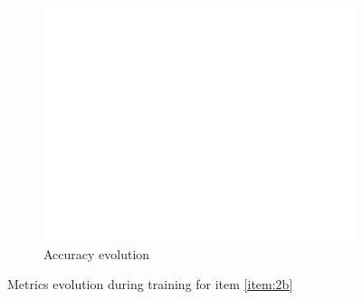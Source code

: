 \documentclass[10pt, a4paper]{article}
\begin{document}
\begin{figure}[htpb]
\begin{subfigure}[b]{0.32\textwidth}
      \centering
      \includegraphics[width=\textwidth]{images/Patch64_scratch_acc.pdf}
      \caption{Accuracy evolution}
      \label{fig:q2b_acc}
  \end{subfigure}
  \caption{Metrics evolution during training for item \ref{item:2b}}
  \label{fig:q2b_metrics}
\end{figure}
\end{document}
